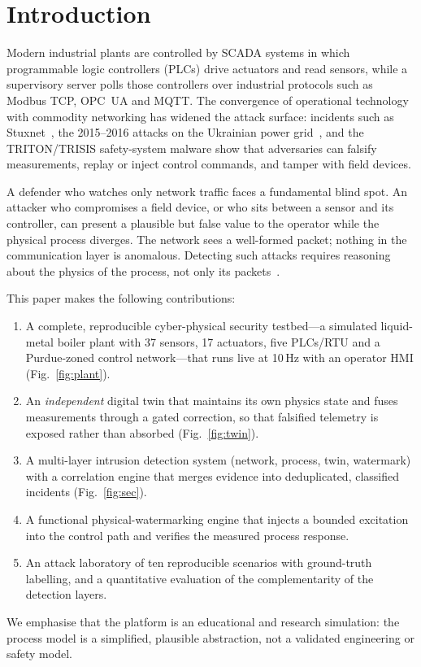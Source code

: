 \documentclass[conference]{IEEEtran}
\begin{document}
\section{Introduction}
Modern industrial plants are controlled by SCADA systems in which programmable logic controllers (PLCs) drive actuators and read sensors, while a supervisory server polls those controllers over industrial protocols such as Modbus TCP, OPC~UA and MQTT. The convergence of operational technology with commodity networking has widened the attack surface: incidents such as Stuxnet~\cite{stuxnet}, the 2015--2016 attacks on the Ukrainian power grid~\cite{ukraine}, and the TRITON/TRISIS safety-system malware show that adversaries can falsify measurements, replay or inject control commands, and tamper with field devices.

A defender who watches only network traffic faces a fundamental blind spot. An attacker who compromises a field device, or who sits between a sensor and its controller, can present a plausible but false value to the operator while the physical process diverges. The network sees a well-formed packet; nothing in the communication layer is anomalous. Detecting such attacks requires reasoning about the physics of the process, not only its packets~\cite{cardenas,urbina}.

This paper makes the following contributions:
\begin{enumerate}
\item A complete, reproducible cyber-physical security testbed---a simulated liquid-metal boiler plant with 37 sensors, 17 actuators, five PLCs/RTU and a Purdue-zoned control network---that runs live at 10\,Hz with an operator HMI (Fig.~\ref{fig:plant}).
\item An \emph{independent} digital twin that maintains its own physics state and fuses measurements through a gated correction, so that falsified telemetry is exposed rather than absorbed (Fig.~\ref{fig:twin}).
\item A multi-layer intrusion detection system (network, process, twin, watermark) with a correlation engine that merges evidence into deduplicated, classified incidents (Fig.~\ref{fig:sec}).
\item A functional physical-watermarking engine that injects a bounded excitation into the control path and verifies the measured process response.
\item An attack laboratory of ten reproducible scenarios with ground-truth labelling, and a quantitative evaluation of the complementarity of the detection layers.
\end{enumerate}
We emphasise that the platform is an educational and research simulation: the process model is a simplified, plausible abstraction, not a validated engineering or safety model.
\end{document}
